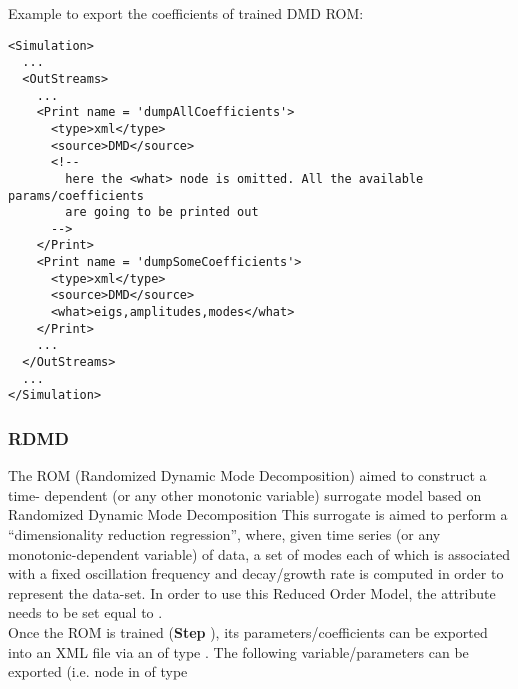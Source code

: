 Example to export the coefficients of trained DMD ROM:
\begin{lstlisting}[style=XML,morekeywords={name,subType}]
<Simulation>
  ...
  <OutStreams>
    ...
    <Print name = 'dumpAllCoefficients'>
      <type>xml</type>
      <source>DMD</source>
      <!--
        here the <what> node is omitted. All the available params/coefficients
        are going to be printed out
      -->
    </Print>
    <Print name = 'dumpSomeCoefficients'>
      <type>xml</type>
      <source>DMD</source>
      <what>eigs,amplitudes,modes</what>
    </Print>
    ...
  </OutStreams>
  ...
</Simulation>
\end{lstlisting}


\subsubsection{RDMD}
  The  ROM (Randomized Dynamic Mode Decomposition) aimed to construct a time-
  dependent (or any other monotonic     variable) surrogate model based on Randomized Dynamic Mode
  Decomposition     This surrogate is aimed to perform a ``dimensionality reduction regression'',
  where, given time     series (or any monotonic-dependent variable) of data, a set of modes each of
  which is associated     with a fixed oscillation frequency and decay/growth rate is computed
  in order to represent the data-set.     In order to use this Reduced Order Model, the
   attribute      needs to be set equal to .     \\
  Once the ROM  is trained (\textbf{Step} ), its parameters/coefficients can be
  exported into an XML file     via an  of type . The following
  variable/parameters  can be exported (i.e.  node     in  of type
